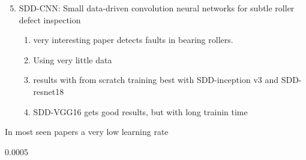 \documentclass{scrartcl}
\begin{document}
\begin{enumerate}[1]
\setcounter{enumi}{4}
\item SDD-CNN: Small data-driven convolution neural networks for subtle roller defect inspection
	\begin{enumerate}[a]
	\item very interesting paper detects faults in bearing rollers. 
	\item Using very little data
	\item results with from scratch training best with SDD-inception v3 and SDD-resnet18
	\item SDD-VGG16 gets good results, but with long trainin time
	\end{enumerate}
\end{enumerate}


In most seen papers a very low learning rate 

0.0005 
\end{document}
